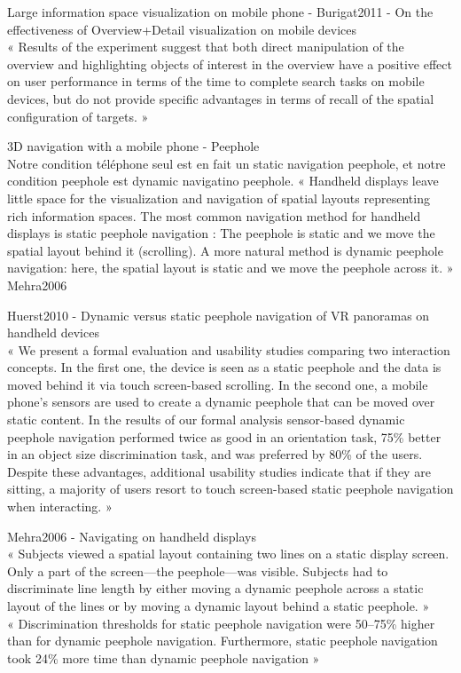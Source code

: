 Large information space visualization on mobile phone - Burigat2011 - On the effectiveness of Overview+Detail visualization on mobile devices\\
« Results of the experiment suggest that both direct manipulation of the overview and highlighting objects of interest in the overview have a positive effect on user performance in terms of the time to complete search tasks on mobile devices, but do not provide specific advantages in terms of recall of the spatial configuration of targets. »

3D navigation with a mobile phone - Peephole\\
Notre condition téléphone seul est en fait un static navigation peephole, et notre condition peephole est dynamic navigatino peephole.
« Handheld displays leave little space for the visualization and navigation of spatial layouts representing rich information spaces. The most common navigation method for handheld displays is static peephole navigation : The peephole is static and we move the spatial layout behind it (scrolling). A more natural method is dynamic peephole navigation: here, the spatial layout is static and we move the peephole across it. » Mehra2006

Huerst2010 - Dynamic versus static peephole navigation of VR panoramas on handheld devices\\
« We present a formal evaluation and usability studies comparing two interaction concepts. In the first one, the device is seen as a static peephole and the data is moved behind it via touch screen-based scrolling. In the second one, a mobile phone’s sensors are used to create a dynamic peephole that can be moved over static content. In the results of our formal analysis sensor-based dynamic peephole navigation performed twice as good in an orientation task, 75\% better in an object size discrimination task, and was preferred by 80\% of the users. Despite these advantages, additional usability studies indicate that if they are sitting, a majority of users resort to touch screen-based static peephole navigation when interacting. »

Mehra2006 - Navigating on handheld displays\\
« Subjects viewed a spatial layout containing two lines on a static display screen. Only a part of the screen—the peephole—was visible. Subjects had to discriminate line length by either moving a dynamic peephole across a static layout of the lines or by moving a dynamic layout behind a static peephole. »\\
« Discrimination thresholds for static peephole navigation were 50–75\% higher than for dynamic peephole navigation. Furthermore, static peephole navigation took 24\% more time than dynamic peephole navigation »